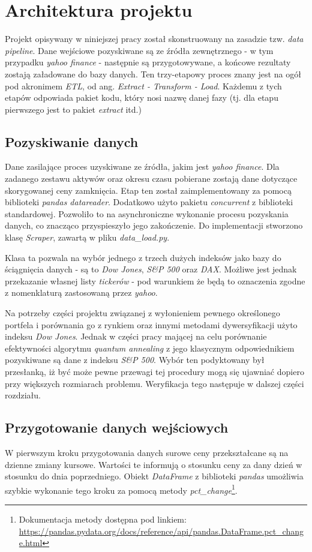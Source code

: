 \documentclass[12pt,a4paper,twoside,openany]{book}
\begin{document}
\section{Architektura projektu}

Projekt opisywany w niniejszej pracy został skonstruowany na zasadzie tzw. \textit{data pipeline}.
Dane wejściowe pozyskiwane są ze źródła zewnętrznego - w tym przypadku \textit{yahoo finance} - następnie są przygotowywane, a końcowe rezultaty zostają załadowane do bazy danych.
Ten trzy-etapowy proces znany jest na ogół pod akronimem \textit{ETL}, od ang. \textit{Extract - Transform - Load}.
Każdemu z tych etapów odpowiada pakiet kodu, który nosi nazwę danej fazy (tj. dla etapu pierwszego jest to pakiet \textit{extract} itd.)

\subsection{Pozyskiwanie danych}
Dane zasilające proces uzyskiwane ze źródła, jakim jest \textit{yahoo finance}.
Dla zadanego zestawu aktywów oraz okresu czasu pobierane zostają dane dotyczące skorygowanej ceny zamknięcia.
Etap ten został zaimplementowany za pomocą biblioteki \textit{pandas \textendash datareader}.
Dodatkowo użyto pakietu \textit{concurrent} z biblioteki standardowej.
Pozwoliło to na asynchroniczne wykonanie procesu pozyskania danych, co znacząco przyspieszyło jego zakończenie.
Do implementacji stworzono klasę \textit{Scraper}, zawartą w pliku \textit{data\_load.py}.

Klasa ta pozwala na wybór jednego z trzech dużych indeksów jako bazy do ściągnięcia danych - są to \textit{Dow Jones}, \textit{S\&P 500} oraz \textit{DAX}.
Możliwe jest jednak przekazanie własnej listy \textit{tickerów} - pod warunkiem że będą to oznaczenia zgodne z nomenklaturą zastosowaną przez \textit{yahoo}.

Na potrzeby części projektu związanej z wyłonieniem pewnego określonego portfela i porównania go z rynkiem oraz innymi metodami dywersyfikacji użyto indeksu \textit{Dow Jones}.
Jednak w części pracy mającej na celu porównanie efektywności algorytmu \textit{quantum annealing} z jego klasycznym odpowiednikiem pozyskiwane są dane z indeksu \textit{S\&P 500}.
Wybór ten podyktowany był przesłanką, iż być może pewne przewagi tej procedury mogą się ujawniać dopiero przy większych rozmiarach problemu.
Weryfikacja tego następuje w dalszej części rozdziału.


\subsection{Przygotowanie danych wejściowych}
\label{subsection:data-prep}
W pierwszym kroku przygotowania danych surowe ceny przekształcane są na dzienne zmiany kursowe.
Wartości te informują o stosunku ceny za dany dzień w stosunku do dnia poprzedniego.
Obiekt \textit{DataFrame} z biblioteki \textit{pandas} umożliwia szybkie wykonanie tego kroku za pomocą metody \textit{pct\_change}\footnote{Dokumentacja metody dostępna pod linkiem: \url{https://pandas.pydata.org/docs/reference/api/pandas.DataFrame.pct_change.html}}.
\end{document}
